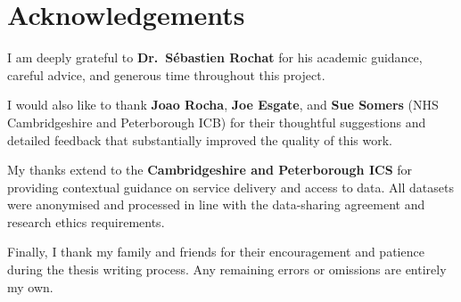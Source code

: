 \documentclass[ %
                    author={Nattanan Nawakitbamrung},
                supervisor={Dr. Sébastien Rochat},
                    degree={MSc},
                     title={Developing and Evaluating the Impact of a Single Patient Treatment List (PTL) for an NHS Integrated Care System},
                  subtitle={},
                      type={},
                      year={2025}]{dissertation}
\begin{document}


\chapter*{Acknowledgements}

\noindent
I am deeply grateful to \textbf{Dr.~Sébastien Rochat} for his academic guidance, careful advice, and generous time throughout this project.

I would also like to thank \textbf{Joao Rocha}, \textbf{Joe Esgate}, and \textbf{Sue Somers} (NHS Cambridgeshire and Peterborough ICB) for their thoughtful suggestions and detailed feedback that substantially improved the quality of this work.

My thanks extend to the \textbf{Cambridgeshire and Peterborough ICS} for providing contextual guidance on service delivery and access to data. All datasets were anonymised and processed in line with the data-sharing agreement and research ethics requirements.

Finally, I thank my family and friends for their encouragement and patience during the thesis writing process. Any remaining errors or omissions are entirely my own.



%
\end{document}
